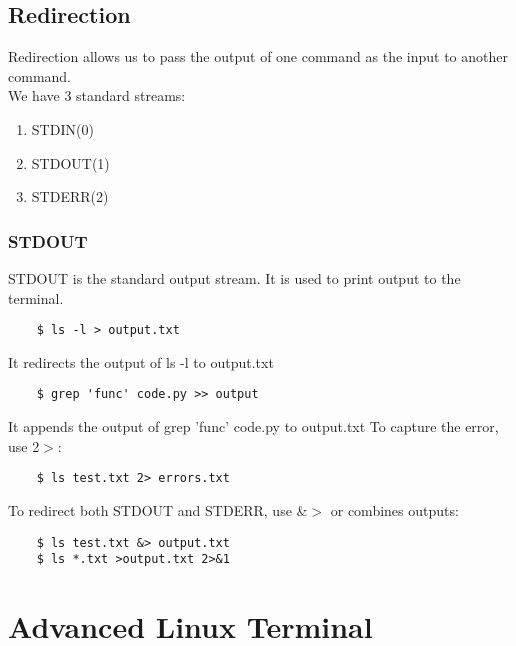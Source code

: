 \documentclass[12pt,a4paper]{article}
\begin{document}
\subsection{Redirection}
Redirection allows us to pass the output of one command as the input to another command.\\
We have 3 standard streams:
\begin{enumerate}
    \item STDIN(0)
    \item STDOUT(1)
    \item STDERR(2)
\end{enumerate} 
\subsubsection{STDOUT}
STDOUT is the standard output stream. It is used to print output to the terminal.\\
\begin{lstlisting}
    $ ls -l > output.txt
\end{lstlisting}
It redirects the output of ls -l to output.txt
\begin{lstlisting}
    $ grep 'func' code.py >> output
\end{lstlisting}
It appends the output of grep 'func' code.py to output.txt
To capture the error, use 2$>$:
\begin{lstlisting}
    $ ls test.txt 2> errors.txt
\end{lstlisting}
To redirect both STDOUT and STDERR, use \&$>$ or combines outputs:
\begin{lstlisting}
    $ ls test.txt &> output.txt
    $ ls *.txt >output.txt 2>&1
\end{lstlisting}


\section{Advanced Linux Terminal}
\end{document}
